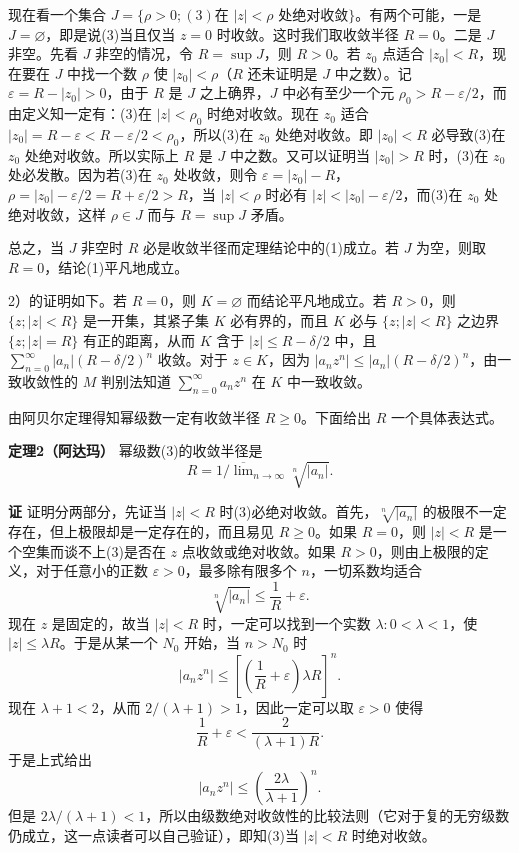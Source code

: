 现在看一个集合 $J=\{\rho>0;(3)\text{在 }|z|<\rho\text{ 处绝对收敛}\}$。有两个可能，一是 $J=\varnothing$，即是说(3)当且仅当 $z=0$ 时收敛。这时我们取收敛半径 $R=0$。二是 $J$ 非空。先看 $J$ 非空的情况，令 $R=\sup J$，则 $R>0$。若 $z_0$ 点适合 $|z_0|<R$，现在要在 $J$ 中找一个数 $\rho$ 使 $|z_0|<\rho$（$R$ 还未证明是 $J$ 中之数）。记 $\varepsilon=R-|z_0|>0$，由于 $R$ 是 $J$ 之上确界，$J$ 中必有至少一个元 $\rho_0>R-\varepsilon/2$，而由定义知一定有：(3)在 $|z|<\rho_0$ 时绝对收敛。现在 $z_0$ 适合 $|z_0|=R-\varepsilon<R-\varepsilon/2<\rho_0$，所以(3)在 $z_0$ 处绝对收敛。即 $|z_0|<R$ 必导致(3)在 $z_0$ 处绝对收敛。所以实际上 $R$ 是 $J$ 中之数。又可以证明当 $|z_0|>R$ 时，(3)在 $z_0$ 处必发散。因为若(3)在 $z_0$ 处收敛，则令 $\varepsilon=|z_0|-R$，$\rho=|z_0|-\varepsilon/2=R+\varepsilon/2>R$，当 $|z|<\rho$ 时必有 $|z|<|z_0|-\varepsilon/2$，而(3)在 $z_0$ 处绝对收敛，这样 $\rho\in J$ 而与 $R=\sup J$ 矛盾。

总之，当 $J$ 非空时 $R$ 必是收敛半径而定理结论中的(1)成立。若 $J$ 为空，则取 $R=0$，结论(1)平凡地成立。

2）的证明如下。若 $R=0$，则 $K=\varnothing$ 而结论平凡地成立。若 $R>0$，则 $\{z;|z|<R\}$ 是一开集，其紧子集 $K$ 必有界的，而且 $K$ 必与 $\{z;|z|<R\}$ 之边界 $\{z;|z|=R\}$ 有正的距离，从而 $K$ 含于 $|z|\le R-\delta/2$ 中，且 $\sum_{n=0}^{\infty}|a_n|(R-\delta/2)^n$ 收敛。对于 $z\in K$，因为 $|a_nz^n|\le|a_n|(R-\delta/2)^n$，由一致收敛性的 $M$ 判别法知道 $\sum_{n=0}^{\infty}a_nz^n$ 在 $K$ 中一致收敛。

由阿贝尔定理得知幂级数一定有收敛半径 $R\ge0$。下面给出 $R$ 一个具体表达式。

\noindent\textbf{定理2（阿达玛）}
幂级数(3)的收敛半径是
\begin{equation}
 R=1\bigg/\overline{\lim}_{n\to\infty}\sqrt[n]{|a_n|}.
 \tag{4}
\end{equation}

\noindent\textbf{证}
证明分两部分，先证当 $|z|<R$ 时(3)必绝对收敛。首先，$\sqrt[n]{|a_n|}$ 的极限不一定存在，但上极限却是一定存在的，而且易见 $R\ge0$。如果 $R=0$，则 $|z|<R$ 是一个空集而谈不上(3)是否在 $z$ 点收敛或绝对收敛。如果 $R>0$，则由上极限的定义，对于任意小的正数 $\varepsilon>0$，最多除有限多个 $n$，一切系数均适合
\[
 \sqrt[n]{|a_n|}\le\frac1R+\varepsilon.
\]
现在 $z$ 是固定的，故当 $|z|<R$ 时，一定可以找到一个实数 $\lambda:0<\lambda<1$，使 $|z|\le\lambda R$。于是从某一个 $N_0$ 开始，当 $n>N_0$ 时
\[
 |a_nz^n|\le\left[\left(\frac1R+\varepsilon\right)\lambda R\right]^n.
\]
现在 $\lambda+1<2$，从而 $2/(\lambda+1)>1$，因此一定可以取 $\varepsilon>0$ 使得
\[
 \frac1R+\varepsilon<\frac2{(\lambda+1)R}.
\]
于是上式给出
\[
 |a_nz^n|\le\left(\frac{2\lambda}{\lambda+1}\right)^n.
\]
但是 $2\lambda/(\lambda+1)<1$，所以由级数绝对收敛性的比较法则（它对于复的无穷级数仍成立，这一点读者可以自己验证），即知(3)当 $|z|<R$ 时绝对收敛。

